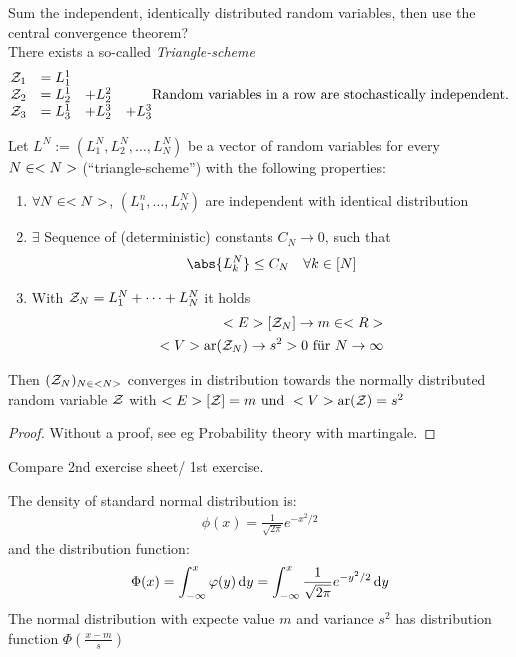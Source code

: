 Sum the independent, identically distributed random variables, then use the central convergence theorem?\\
There exists a so-called \emph{Triangle-scheme}
\begin{align*}
	\begin{matrix}
	\mathcal{Z}_1 &= L_1^1 & &\\
	\mathcal{Z}_2 &= L_2^1 &+L^2_2 &\\
	\mathcal{Z}_3 &= L_3^1 &+L^3_2 &+L^3_3\\
	\end{matrix} \text{Random variables in a row are stochastically independent.}
\end{align*}
\begin{theorem}
	Let $L^N := (L^N_1, L^N_2, \dots, L^N_N)$ be a vector of random variables for every $N \in <N>$ (``triangle-scheme'') with the following properties:
	\begin{enumerate}
		\item $\forall N \in <N>$, $(L^n_1, \dots, L_N^N)$ are independent with identical distribution
		\item $\exists$ Sequence of (deterministic) constants $C_N \to 0$, such that
		\begin{align*}
			\abs{L_k^N} \le C_N \quad \forall k \in [N]
		\end{align*}
		\item With $\mathcal{Z}_N = L^N_1 + \dots + L^N_N$ it holds
		\begin{align*}
			<E>[\mathcal{Z}_N] \to m \in <R>\\
			<V>\text{ar}(\mathcal{Z}_N) \to s^2 > 0 \text{ für }N \to \infty
		\end{align*}
	\end{enumerate}
	Then $(\mathcal{Z}_N)_{N \in <N>}$ converges in distribution towards the normally distributed random variable $\mathcal{Z}$ with $<E>[\mathcal{Z}] = m \text{ und } <V>\text{ar}(\mathcal{Z}) = s^2$
\end{theorem}
\begin{proof}
	Without a proof, see eg Probability theory with martingale.
\end{proof}
\begin{*remark}
	Compare 2nd exercise sheet/ 1st exercise.
\end{*remark}
\begin{erinnerung} %
	The density of standard normal distribution is:
	\begin{align*}
		\phi(x) = \frac{1}{\sqrt{2\pi}} e^{-x^2/2}
	\end{align*}
	and the distribution function:
	\begin{align*}
		\Phi(x) = \int_{-\infty}^x \varphi(y) \,\mathrm{d} y = \int_{-\infty}^x \frac{1}{\sqrt{2\pi}} e^{-y^2/2} \,\mathrm{d} y
	\end{align*}
	The normal distribution with expecte value $m$ and variance $s^2$ has distribution function $\Phi(\frac{x-m}{s})$
\end{erinnerung}
